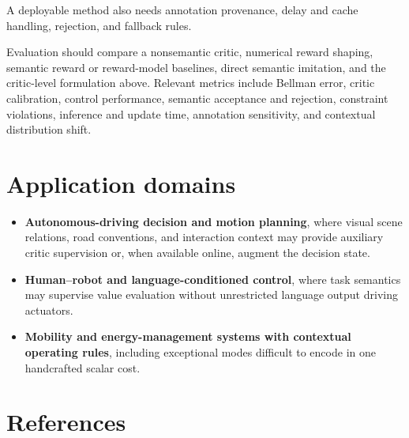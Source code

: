 \documentclass[a4paper]{article}
\begin{document}
A deployable method also needs annotation provenance, delay and cache
handling, rejection, and fallback rules.

Evaluation should compare a nonsemantic critic, numerical reward shaping,
semantic reward or reward-model baselines, direct semantic imitation, and the
critic-level formulation above. Relevant metrics include Bellman error,
critic calibration, control performance, semantic acceptance and rejection,
constraint violations, inference and update time, annotation sensitivity,
and contextual distribution shift.

\section{Application domains}

\begin{itemize}
  \item \textbf{Autonomous-driving decision and motion planning}, where visual scene
  relations, road conventions, and interaction context may provide auxiliary
  critic supervision or, when available online, augment the decision state.
  \item \textbf{Human--robot and language-conditioned control}, where task semantics
  may supervise value evaluation without unrestricted language output driving
  actuators.
  \item \textbf{Mobility and energy-management systems with contextual operating rules},
  including exceptional modes difficult to encode in one handcrafted scalar
  cost.
\end{itemize}

\section{References}
\end{document}
